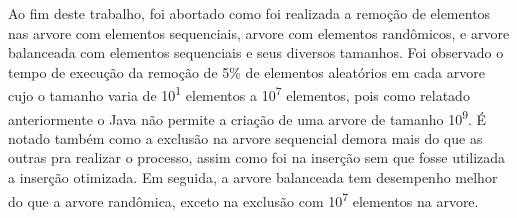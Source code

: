 \label{Conclusão}
Ao fim deste trabalho, foi abortado como foi realizada a remoção de elementos nas arvore com elementos sequenciais, arvore com elementos randômicos, e arvore balanceada com elementos sequenciais e seus diversos tamanhos. Foi observado o tempo de execução da remoção de 5\% de elementos aleatórios em cada arvore cujo o tamanho varia de 10\textsuperscript{1} elementos a 10\textsuperscript{7} elementos, pois como relatado anteriormente o Java não permite a criação de uma arvore de tamanho 10\textsuperscript{9}. É notado também como a exclusão na arvore sequencial demora mais do que as outras pra realizar o processo, assim como foi na inserção sem que fosse utilizada a inserção otimizada. Em seguida, a arvore balanceada tem desempenho melhor do que a arvore randômica, exceto na exclusão com 10\textsuperscript{7} elementos na arvore.



